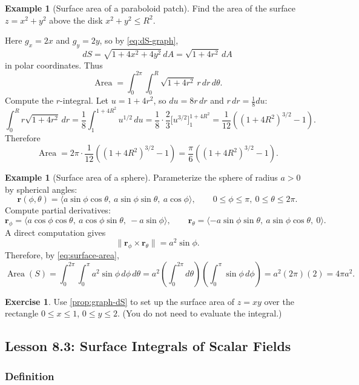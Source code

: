 \documentclass[12pt]{article}
\numberwithin{equation}{section}
\newcommand{\vect}[1]{\boldsymbol{#1}}   %
\theoremstyle{plain}
\theoremstyle{definition}
\newtheorem{example}[theorem]{Example}
\newtheorem{exercise}[theorem]{Exercise}
\theoremstyle{remark}
\begin{document}
\begin{example}[Surface area of a paraboloid patch]\label{ex:paraboloid-area}
Find the area of the surface $z=x^2+y^2$ above the disk $x^2+y^2\le R^2$.

Here $g_x=2x$ and $g_y=2y$, so by \cref{eq:dS-graph},
\[
dS=\sqrt{1+4x^2+4y^2}\,dA=\sqrt{1+4r^2}\,dA
\]
in polar coordinates. Thus
\[
\operatorname{Area}
=\int_{0}^{2\pi}\int_{0}^{R}\sqrt{1+4r^2}\,r\,dr\,d\theta.
\]
Compute the $r$-integral. Let $u=1+4r^2$, so $du=8r\,dr$ and $r\,dr=\frac{1}{8}du$:
\[
\int_0^R r\sqrt{1+4r^2}\,dr
=\frac{1}{8}\int_{1}^{1+4R^2} u^{1/2}\,du
=\frac{1}{8}\cdot \frac{2}{3}\Big[u^{3/2}\Big]_{1}^{1+4R^2}
=\frac{1}{12}\left((1+4R^2)^{3/2}-1\right).
\]
Therefore
\[
\operatorname{Area}
=2\pi\cdot \frac{1}{12}\left((1+4R^2)^{3/2}-1\right)
=\frac{\pi}{6}\left((1+4R^2)^{3/2}-1\right).
\]
\end{example}

\begin{example}[Surface area of a sphere]\label{ex:sphere-area}
Parameterize the sphere of radius $a>0$ by spherical angles:
\[
\vect r(\phi,\theta)=\langle a\sin\phi\cos\theta,\ a\sin\phi\sin\theta,\ a\cos\phi\rangle,
\qquad 0\le \phi\le \pi,\ 0\le\theta\le 2\pi.
\]
Compute partial derivatives:
\[
\vect r_\phi=\langle a\cos\phi\cos\theta,\ a\cos\phi\sin\theta,\ -a\sin\phi\rangle,\qquad
\vect r_\theta=\langle -a\sin\phi\sin\theta,\ a\sin\phi\cos\theta,\ 0\rangle.
\]
A direct computation gives
\[
\bigl\|\vect r_\phi\times \vect r_\theta\bigr\|=a^2\sin\phi.
\]
Therefore, by \cref{eq:surface-area},
\[
\operatorname{Area}(S)
=\int_{0}^{2\pi}\int_{0}^{\pi} a^2\sin\phi\,d\phi\,d\theta
=a^2\left(\int_{0}^{2\pi}d\theta\right)\left(\int_{0}^{\pi}\sin\phi\,d\phi\right)
=a^2(2\pi)(2)=4\pi a^2.
\]
\end{example}

\begin{exercise}
Use \cref{prop:graph-dS} to set up the surface area of $z=xy$ over the rectangle $0\le x\le 1$, $0\le y\le 2$.
(You do not need to evaluate the integral.)
\end{exercise}

\subsection{Lesson 8.3: Surface Integrals of Scalar Fields}

\subsubsection{Definition}
\end{document}

